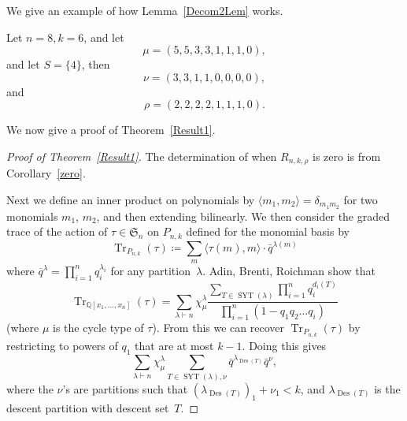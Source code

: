 \documentclass[ALCO,ThmDefs,Unicode,epreuves]{cedram}
\DeclareMathOperator{\Des}{Des}
\DeclareMathOperator{\SYT}{SYT}
\DeclareMathOperator{\Tr}{Tr}
\begin{document}
We give an example of how Lemma~\ref{Decom2Lem} works.

\begin{exam}

	Let $n=8,k=6$, and let
\begin{equation}
\mu=(5,5,3,3,1,1,1,0),
\end{equation}
and let $S=\{4\}$, 
then
\begin{equation}
\nu=(3,3,1,1,0,0,0,0),
\end{equation}
and
\begin{equation}
\rho=(2,2,2,2,1,1,1,0).
\end{equation}
\end{exam}


We now give a proof of Theorem~\ref{Result1}.
	\begin{proof}[Proof of Theorem~\ref{Result1}]
		The determination of when $R_{n,k,\rho}$ is zero is from Corollary~\ref{zero}.
		
		Next we define an inner product on polynomials by $\langle m_1, m_2 \rangle=\delta_{m_1m_2}$ for two monomials $m_1$, 
$m_2$, and then extending bilinearly.
		 We then consider the graded trace of the action of $\tau\in \mathfrak{S}_n$ on $P_{n,k}$ defined for the monomial 
basis by
\begin{equation}
\Tr _{P_{n,k}}(\tau)\coloneqq \sum_m \langle \tau(m),m\rangle \cdot 
\bar{q}^{\lambda(m)}
\end{equation}
where $\overline{q}^{\lambda}=\prod_{i=1}^n q_i^{\lambda_i}$ for any partition~$\lambda$. Adin, Brenti, Roichman show that
\begin{equation}
\Tr_{\mathbb{Q}[x_1,\ldots, x_n]}(\tau)=\sum_{\lambda\vdash n} \chi^\lambda_\mu\frac{\sum_{T\in \SYT (\lambda)} 
\prod_{i=1}^n q_i^{d_i(T)}}{\prod_{i=1}^n (1-q_1q_2\ldots q_i)}
\end{equation}
(where $\mu$ is the cycle type of $\tau$).
From this we can recover $\Tr _{P_{n,k}}(\tau)$ by restricting to powers of $q_1$ that are at most $k-1$. Doing this 
gives
\begin{equation}
\sum_{\lambda\vdash n}\chi_\mu^\lambda\sum_{T\in 
\SYT (\lambda),\nu}\bar{q}^{\lambda_{\Des (T)}}\bar{q}^\nu,
\end{equation}
 where the $\nu$'s are partitions such that 
$(\lambda_{\Des (T)})_1+\nu_1<k$, and $\lambda_{\Des (T)}$ is the descent partition with descent set~$T$.


\end{proof}
\end{document}
